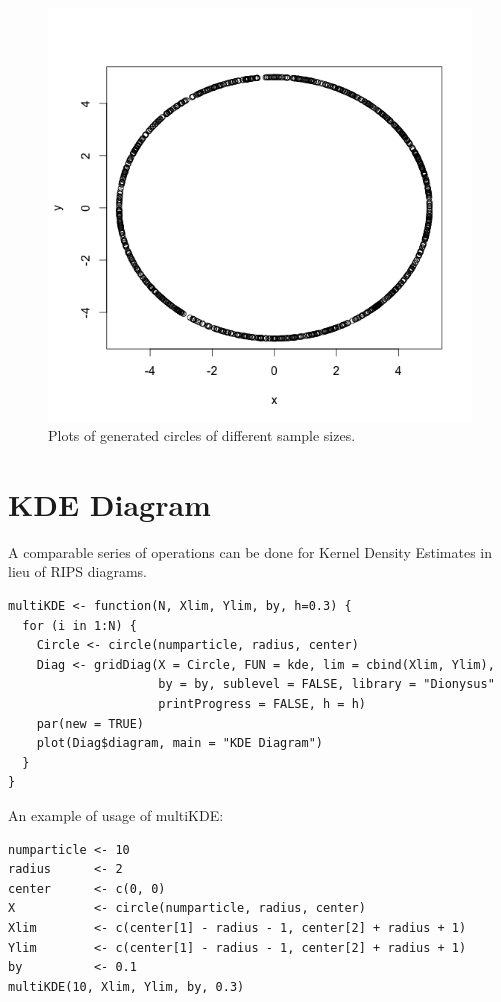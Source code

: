 \documentclass[a4paper]{article}
\begin{document}
\begin{figure}[!htb]
\endminipage\hfill
{}
  \includegraphics[width=\linewidth]{circle1000.png}
\endminipage\hfill
\caption{Plots of generated circles of different sample sizes.}
\end{figure}

\section{KDE Diagram}
A comparable series of operations can be done for Kernel Density Estimates in lieu of RIPS diagrams. 

\begin{lstlisting}
multiKDE <- function(N, Xlim, Ylim, by, h=0.3) {
  for (i in 1:N) {
    Circle <- circle(numparticle, radius, center)
    Diag <- gridDiag(X = Circle, FUN = kde, lim = cbind(Xlim, Ylim), 
                     by = by, sublevel = FALSE, library = "Dionysus"
                     printProgress = FALSE, h = h)
    par(new = TRUE)
    plot(Diag$diagram, main = "KDE Diagram")
  }
}
\end{lstlisting}

\noindent An example of usage of multiKDE:
\begin{lstlisting}
numparticle <- 10
radius      <- 2      
center      <- c(0, 0)
X           <- circle(numparticle, radius, center)
Xlim        <- c(center[1] - radius - 1, center[2] + radius + 1)
Ylim        <- c(center[1] - radius - 1, center[2] + radius + 1)
by          <- 0.1
multiKDE(10, Xlim, Ylim, by, 0.3)
\end{lstlisting}
\end{document}

